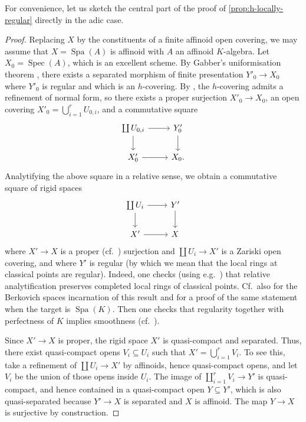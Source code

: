 \documentclass[a4paper,twoside,11pt,reqno]{amsart}
\DeclareMathOperator{\Spec}{Spec}
\DeclareMathOperator{\Spa}{Spa}
\theoremstyle{definition}
\numberwithin{equation}{subsection}
\begin{document}
For convenience, let us sketch the central part of the proof of \cref{prop:h-locally-regular} directly in the adic case.

\begin{proof}
Replacing $X$ by the constituents of a finite affinoid open covering, we may assume that $X=\Spa(A)$ is affinoid with $A$ an affinoid $K$-algebra. Let $X_0=\Spec(A)$, which is an excellent scheme. By Gabber's uniformisation theorem \cite[Th\'eor\`eme~1.1]{TravauxGabberIX}, there exists a separated morphism of finite presentation $Y'_0\to X_0$ where $Y'_0$ is regular and which is an $h$-covering. By \cite[Corollary~10.4]{SuslinVoevodsky}, the $h$-covering admits a refinement of normal form, so there exists a proper surjection $X'_0\to X_0$, an open covering $X'_0 = \bigcup_{i=1}^r U_{0,i}$, and a commutative square
\[ 
    \begin{tikzcd}
        \coprod U_{0,i} \ar[d] \ar[r] & Y'_0 \ar[d] \\
        X'_0 \ar[r] & X_0.
    \end{tikzcd}
\]
Analytifying the above square in a relative sense, we obtain a commutative square of rigid spaces 
\[ 
    \begin{tikzcd}
        \coprod U_i \ar[d] \ar[r] & Y' \ar[d] \\
        X'\ar[r] & X
    \end{tikzcd}
\]
where $X'\to X$ is a proper  (cf.~\cite[Lemma~5.7.3]{HuberBook}) surjection and $\coprod U_i \to X'$ is a Zariski open covering, and where $Y'$ is regular (by which we mean that the local rings at classical points are regular).
Indeed, one checks (using e.g.\ \cite[Satz 2.1]{Kopf}) that relative analytification preserves completed local rings of classical points. Cf.\ also \cite[Lemma 2.6.3]{Berkovich:EtaleCohomology} for the Berkovich spaces incarnation of this result and \cite[I \S 4.1, Proposition 2]{Bosch} for a proof of the same statement when the target is $\Spa(K)$. Then one checks that regularity together with perfectness of $K$ implies smoothness (cf.\ \cite[\S 5]{Berkovich:VanishingCyclesAnalytic}).

Since $X'\to X$ is proper, the rigid space $X'$ is quasi-compact and separated. Thus, there exist quasi-compact opens $V_i\subseteq U_i$ such that $X'=\bigcup_{i=1}^r V_i$. To see this, take a refinement of $\coprod U_i \to X'$ by affinoids, hence quasi-compact opens, and let $V_i$ be the union of those opens inside $U_i$. The image of $\coprod _{i=1}^r V_i\to Y'$ is quasi-compact, and hence contained in a quasi-compact open $Y\subseteq Y'$, which is also quasi-separated because $Y'\to X$ is separated and $X$ is affinoid. The map $Y\to X$ is surjective by construction. 
\end{proof}
\end{document}
